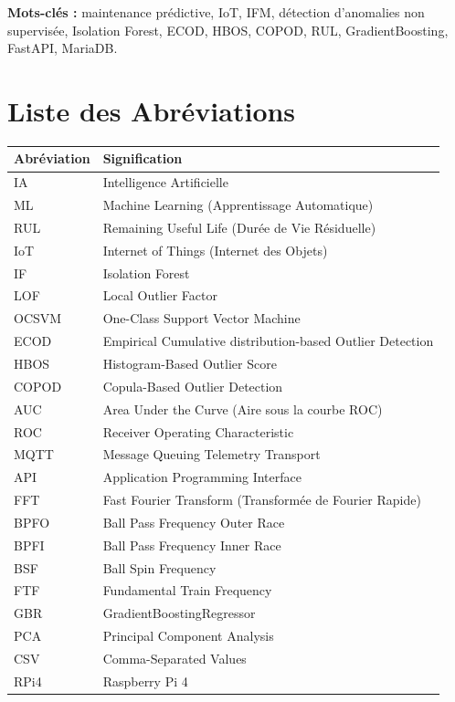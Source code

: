 \documentclass[12pt,a4paper]{report}
\begin{document}
\textbf{Mots-clés :} maintenance prédictive, IoT, IFM, détection d'anomalies non supervisée,
Isolation Forest, ECOD, HBOS, COPOD, RUL, GradientBoosting, FastAPI, MariaDB.

\tableofcontents
\listoffigures
\listoftables

\chapter*{Liste des Abréviations}

\begin{tabular}{p{2.5cm}p{10cm}}
\toprule
\textbf{Abréviation} & \textbf{Signification} \\
\midrule
IA     & Intelligence Artificielle \\
ML     & Machine Learning (Apprentissage Automatique) \\
RUL    & Remaining Useful Life (Durée de Vie Résiduelle) \\
IoT    & Internet of Things (Internet des Objets) \\
IF     & Isolation Forest \\
LOF    & Local Outlier Factor \\
OCSVM  & One-Class Support Vector Machine \\
ECOD   & Empirical Cumulative distribution-based Outlier Detection \\
HBOS   & Histogram-Based Outlier Score \\
COPOD  & Copula-Based Outlier Detection \\
AUC    & Area Under the Curve (Aire sous la courbe ROC) \\
ROC    & Receiver Operating Characteristic \\
MQTT   & Message Queuing Telemetry Transport \\
API    & Application Programming Interface \\
FFT    & Fast Fourier Transform (Transformée de Fourier Rapide) \\
BPFO   & Ball Pass Frequency Outer Race \\
BPFI   & Ball Pass Frequency Inner Race \\
BSF    & Ball Spin Frequency \\
FTF    & Fundamental Train Frequency \\
GBR    & GradientBoostingRegressor \\
PCA    & Principal Component Analysis \\
CSV    & Comma-Separated Values \\
RPi4   & Raspberry Pi 4 \\
\bottomrule
\end{tabular}
\end{document}
